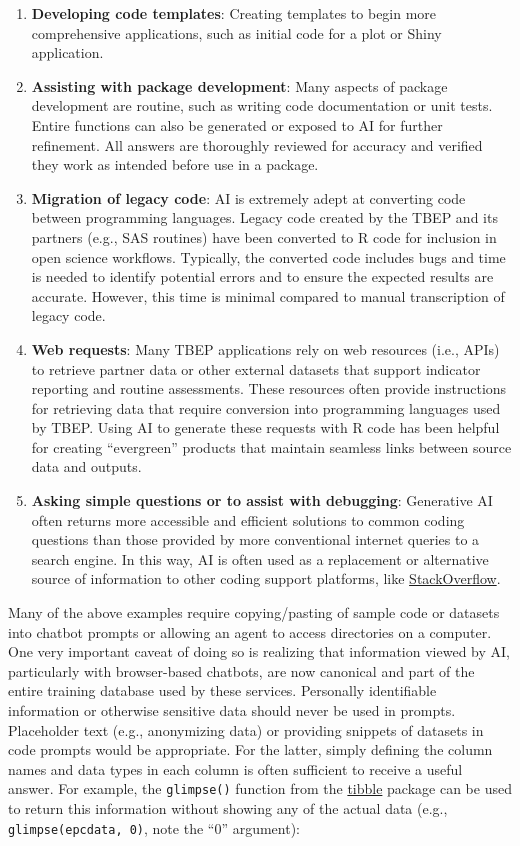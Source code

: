 \documentclass[
]{book}
\providecommand{\tightlist}{%
  \setlength{\itemsep}{0pt}\setlength{\parskip}{0pt}}
\begin{document}
\begin{enumerate}
\def\labelenumi{\arabic{enumi}.}
\tightlist
\item
  \textbf{Developing code templates}: Creating templates to begin more comprehensive applications, such as initial code for a plot or Shiny application.
\item
  \textbf{Assisting with package development}: Many aspects of package development are routine, such as writing code documentation or unit tests. Entire functions can also be generated or exposed to AI for further refinement. All answers are thoroughly reviewed for accuracy and verified they work as intended before use in a package.
\item
  \textbf{Migration of legacy code}: AI is extremely adept at converting code between programming languages. Legacy code created by the TBEP and its partners (e.g., SAS routines) have been converted to R code for inclusion in open science workflows. Typically, the converted code includes bugs and time is needed to identify potential errors and to ensure the expected results are accurate. However, this time is minimal compared to manual transcription of legacy code.
\item
  \textbf{Web requests}: Many TBEP applications rely on web resources (i.e., APIs) to retrieve partner data or other external datasets that support indicator reporting and routine assessments. These resources often provide instructions for retrieving data that require conversion into programming languages used by TBEP. Using AI to generate these requests with R code has been helpful for creating ``evergreen'' products that maintain seamless links between source data and outputs.\\
\item
  \textbf{Asking simple questions or to assist with debugging}: Generative AI often returns more accessible and efficient solutions to common coding questions than those provided by more conventional internet queries to a search engine. In this way, AI is often used as a replacement or alternative source of information to other coding support platforms, like \href{https://stackoverflow.com/}{StackOverflow}.
\end{enumerate}

Many of the above examples require copying/pasting of sample code or datasets into chatbot prompts or allowing an agent to access directories on a computer. One very important caveat of doing so is realizing that information viewed by AI, particularly with browser-based chatbots, are now canonical and part of the entire training database used by these services. Personally identifiable information or otherwise sensitive data should never be used in prompts. Placeholder text (e.g., anonymizing data) or providing snippets of datasets in code prompts would be appropriate. For the latter, simply defining the column names and data types in each column is often sufficient to receive a useful answer. For example, the \texttt{glimpse()} function from the \href{https://tibble.tidyverse.org/}{tibble} package can be used to return this information without showing any of the actual data (e.g., \texttt{glimpse(epcdata,\ 0)}, note the ``0'' argument):
\end{document}
